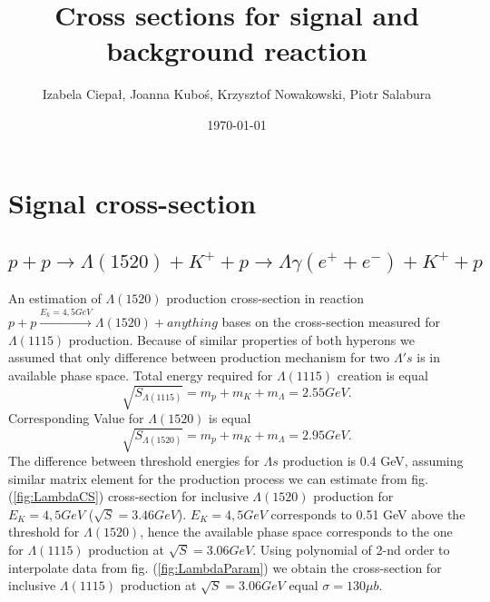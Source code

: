 \documentclass[12pt]{article}
\title{%
  Cross sections for signal and background reaction}
\author{Izabela Ciepał, Joanna Kuboś, Krzysztof Nowakowski, Piotr Salabura}
\date{\today}%
\begin{document}
\maketitle
\section{Signal cross-section}
\subsection{$p+p\rightarrow\Lambda (1520) +K^+ +p\rightarrow \Lambda \gamma (e^{+} + e^{-})+K^+ +p$}
An estimation of $\Lambda (1520)$ production cross-section in reaction $p+p \stackrel{E_k=4,5GeV}{\rightarrow}\Lambda (1520) + anything$ bases on the cross-section measured for $\Lambda(1115)$ production. Because of similar properties of both hyperons we assumed that only difference between production mechanism for two $\Lambda 's$ is in available phase space. Total energy required for $\Lambda (1115)$ creation is equal
\begin{equation}
  \sqrt{S_{\Lambda(1115)}}=m_p+m_K+m_\Lambda=2.55 GeV.
\end{equation}
Corresponding Value for $\Lambda(1520)$ is equal
\begin{equation}
\sqrt{S_{\Lambda(1520)}}=m_p+m_K+m_\Lambda=2.95 GeV.
\end{equation}
The difference between threshold energies for $\Lambda s$ production is 0.4 GeV, assuming similar matrix element for the production process we can estimate from fig. (\ref{fig:LambdaCS}) cross-section for inclusive $\Lambda(1520)$ production for $E_K=4,5 GeV$ ($\sqrt{S}=3.46 GeV$). $E_K=4,5 GeV$ corresponds to 0.51 GeV above the threshold for $\Lambda(1520)$, hence the available phase space corresponds to the one for $\Lambda(1115)$ production at $\sqrt S=3.06 GeV$. Using polynomial of 2-nd order to interpolate data from fig. (\ref{fig:LambdaParam}) we obtain the cross-section for inclusive $\Lambda(1115)$ production at $\sqrt{S} = 3.06 GeV$ equal  $\sigma =130 \mu b$.
\end{document}
